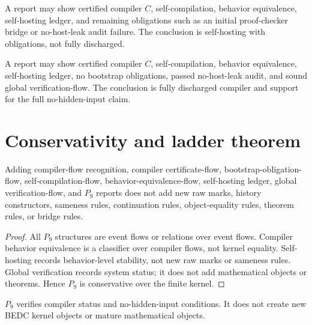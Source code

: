 \begin{example}
\label{ex:self-hosting-with-obligations}
A report may show certified compiler $C$, self-compilation, behavior equivalence, self-hosting ledger, and remaining obligations such as an initial proof-checker bridge or no-host-leak audit failure. The conclusion is self-hosting with obligations, not fully discharged.
\end{example}

\begin{example}
\label{ex:self-hosting-fully-discharged}
A report may show certified compiler $C$, self-compilation, behavior equivalence, self-hosting ledger, no bootstrap obligations, passed no-host-leak audit, and sound global verification-flow. The conclusion is fully discharged compiler and support for the full no-hidden-input claim.
\end{example}

\section{Conservativity and ladder theorem}
\label{sec:self-hosting-conservativity-ladder}

\begin{theorem}
\label{thm:self-hosting-p9-conservative}
Adding compiler-flow recognition, compiler certificate-flow, bootstrap-obligation-flow, self-compilation-flow, behavior-equivalence-flow, self-hosting ledger, global verification-flow, and $P_9$ reports does not add new raw marks, history constructors, sameness rules, continuation rules, object-equality rules, theorem rules, or bridge rules.
\end{theorem}

\begin{proof}
All $P_9$ structures are event flows or relations over event flows. Compiler behavior equivalence is a classifier over compiler flows, not kernel equality. Self-hosting records behavior-level stability, not new raw marks or sameness rules. Global verification records system status; it does not add mathematical objects or theorems. Hence $P_9$ is conservative over the finite kernel.
\end{proof}

\begin{corollary}
\label{cor:self-hosting-p9-verification-layer}
$P_9$ verifies compiler status and no-hidden-input conditions. It does not create new BEDC kernel objects or mature mathematical objects.
\end{corollary}

